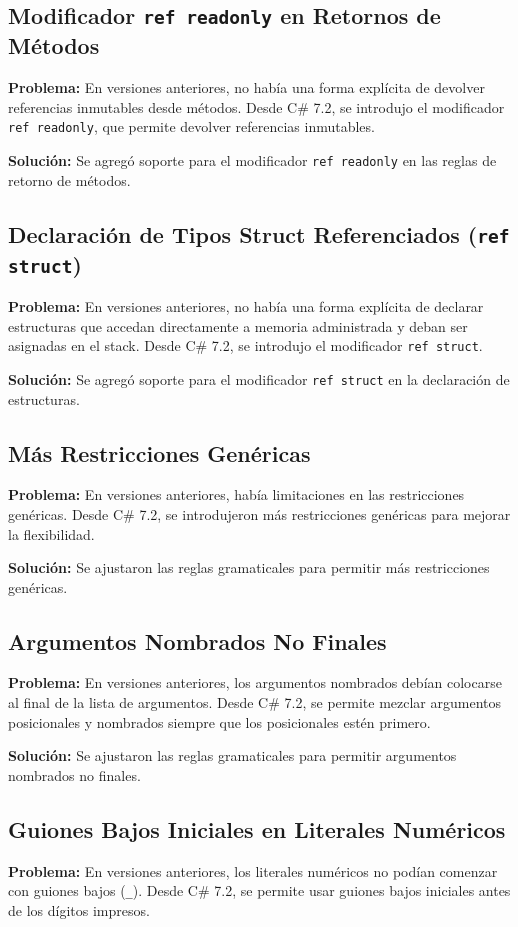 \subsection{Modificador \texttt{ref readonly} en Retornos de Métodos}
\textbf{Problema:} En versiones anteriores, no había una forma explícita de devolver referencias inmutables desde métodos. Desde C\# 7.2, se introdujo el modificador \texttt{ref readonly}, que permite devolver referencias inmutables.

\textbf{Solución:} Se agregó soporte para el modificador \texttt{ref readonly} en las reglas de retorno de métodos.

\subsection{Declaración de Tipos Struct Referenciados (\texttt{ref struct})}
\textbf{Problema:} En versiones anteriores, no había una forma explícita de declarar estructuras que accedan directamente a memoria administrada y deban ser asignadas en el stack. Desde C\# 7.2, se introdujo el modificador \texttt{ref struct}.

\textbf{Solución:} Se agregó soporte para el modificador \texttt{ref struct} en la declaración de estructuras.

\subsection{Más Restricciones Genéricas}
\textbf{Problema:} En versiones anteriores, había limitaciones en las restricciones genéricas. Desde C\# 7.2, se introdujeron más restricciones genéricas para mejorar la flexibilidad.

\textbf{Solución:} Se ajustaron las reglas gramaticales para permitir más restricciones genéricas.

\subsection{Argumentos Nombrados No Finales}
\textbf{Problema:} En versiones anteriores, los argumentos nombrados debían colocarse al final de la lista de argumentos. Desde C\# 7.2, se permite mezclar argumentos posicionales y nombrados siempre que los posicionales estén primero.

\textbf{Solución:} Se ajustaron las reglas gramaticales para permitir argumentos nombrados no finales.

\subsection{Guiones Bajos Iniciales en Literales Numéricos}
\textbf{Problema:} En versiones anteriores, los literales numéricos no podían comenzar con guiones bajos (\texttt{\_}). Desde C\# 7.2, se permite usar guiones bajos iniciales antes de los dígitos impresos.

